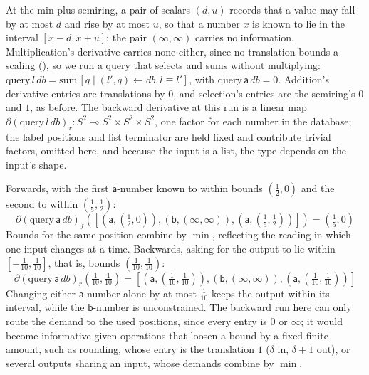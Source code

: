 At the min-plus semiring, a pair of scalars $(d, u)$ records that a value may fall by at most $d$ and
rise by at most $u$, so that a number $x$ is known to lie in the interval $[x - d, x + u]$; the pair
$(\infty, \infty)$ carries no information. Multiplication's derivative carries none either, since no
translation bounds a scaling (), so we run a query that
selects and sums without multiplying: $\mathrm{query}\,l\,\mathit{db} = \mathrm{sum}\,[ q \mid (l', q)
\leftarrow \mathit{db}, l \equiv l' ]$, with $\mathrm{query}\,\mathsf{a}\,\mathit{db} = 0$. Addition's
derivative entries are translations by $0$, and selection's entries are the semiring's $0$ and $1$, as
before. The backward derivative at this run is a linear map $\partial(\mathrm{query}\,l\,\mathit{db})_r :
S^2 \multimap S^2 \times S^2 \times S^2$, one factor for each number in the database; the label
positions and list terminator are held fixed and contribute trivial factors, omitted here, and because the input is a list, the
type depends on the input's shape.

Forwards, with the first $\mathsf{a}$-number known to within bounds $(\frac{1}{2}, 0)$ and the second
to within $(\frac{1}{5}, \frac{1}{2})$:
\begin{displaymath}
  \partial(\mathrm{query}\,\mathsf{a}\,\mathit{db})_f([(\mathsf{a}, (\tfrac{1}{2}, 0)), (\mathsf{b}, (\infty, \infty)), (\mathsf{a}, (\tfrac{1}{5}, \tfrac{1}{2}))]) =
  (\tfrac{1}{5}, 0)
\end{displaymath}
\noindent Bounds for the same position combine by $\min$, reflecting the reading in which one input
changes at a time. Backwards, asking for the output to lie within $[-\frac{1}{10}, \frac{1}{10}]$, that is,
bounds $(\frac{1}{10}, \frac{1}{10})$:
\begin{displaymath}
  \partial(\mathrm{query}\,\mathsf{a}\,\mathit{db})_r(\tfrac{1}{10}, \tfrac{1}{10}) =
  [(\mathsf{a}, (\tfrac{1}{10}, \tfrac{1}{10})), (\mathsf{b}, (\infty, \infty)), (\mathsf{a}, (\tfrac{1}{10}, \tfrac{1}{10}))]
\end{displaymath}
\noindent Changing either $\mathsf{a}$-number alone by at most $\frac{1}{10}$ keeps the output within
its interval, while the $\mathsf{b}$-number is unconstrained. The backward run here can only route the
demand to the used positions, since every entry is $0$ or $\infty$; it would become informative given
operations that loosen a bound by a fixed finite amount, such as rounding, whose entry is the translation
$1$ ($\delta$ in, $\delta + 1$ out), or several outputs sharing an input, whose demands combine by
$\min$.

